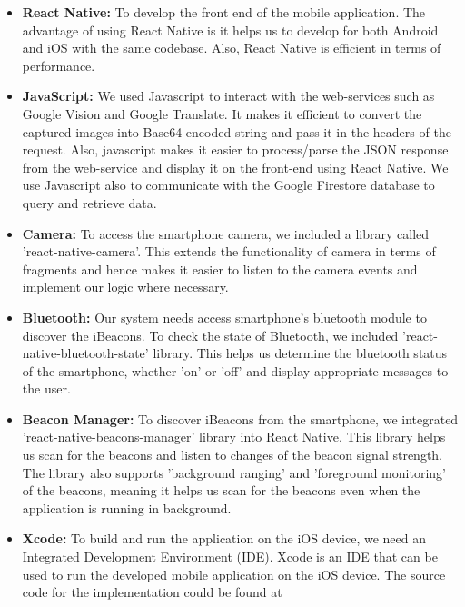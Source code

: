 \documentclass[12pt]{article}
\begin{document}
\begin{itemize}
  \item \textbf{React Native:} To develop the front end of the mobile application. The advantage of using React Native is it helps us to develop for both Android and iOS with the same codebase. Also, React Native is efficient in terms of performance.
  
   \item \textbf{JavaScript:} We used Javascript to interact with the web-services such as Google Vision and Google Translate. It makes it efficient to convert the captured images into Base64 encoded string and pass it in the headers of the request. Also, javascript makes it easier to process/parse the JSON response from the web-service and display it on the front-end using React Native. We use Javascript also to communicate with the Google Firestore database to query and retrieve data.
  
      \item \textbf{Camera:} To access the smartphone camera, we included a library called 'react-native-camera'. This extends the functionality of camera in terms of fragments and hence makes it easier to listen to the camera events and implement our logic where necessary.
      
        \item \textbf{Bluetooth:} Our system needs access smartphone's bluetooth module to discover the iBeacons. To check the state of Bluetooth, we included 'react-native-bluetooth-state' library. This helps us determine the bluetooth status of the smartphone, whether 'on' or 'off' and display appropriate messages to the user.
        
        \item \textbf{Beacon Manager:} To discover iBeacons from the smartphone, we integrated 'react-native-beacons-manager' library into React Native. This library helps us scan for the beacons and listen to changes of the beacon signal strength. The library also supports 'background ranging' and 'foreground monitoring' of the beacons, meaning it helps us scan for the beacons even when the application is running in background. 
      
      \item \textbf{Xcode:} To build and run the application on the iOS device, we need an Integrated Development Environment (IDE). Xcode is an IDE that can be used to run the developed mobile application on the iOS device. The source code for the implementation could be found at \cite{git}
      
 \end{itemize}
 
\end{document}
